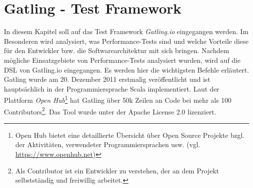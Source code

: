 \chapter{Gatling - Test Framework}

In diesem Kapitel soll auf das Test Framework \textit{Gatling.io} eingegangen werden. Im Besonderen wird analysiert, was Performance-Tests sind und welche Vorteile diese für den Entwickler bzw. die Softwarearchitektur mit sich bringen.
\newline
Nachdem mögliche Einsatzgebiete von Performance-Tests analysiert wurden, wird auf die \ac{DSL} von Gatling.io eingegangen. Es werden hier die wichtigsten Befehle erläutert.\\
Gatling wurde am 20. Dezember 2011 erstmalig veröffentlicht und ist hauptsächlich in der Programmiersprache Scala implementiert. Laut der Plattform \textit{Open Hub}\footnote{{}Open Hub bietet eine detaillierte Übersicht über Open Source Projekte bzgl. der Aktivitäten, verwendeter Programmiersprachen usw. (vgl. \url{https://www.openhub.net})} hat Gatling über 50k Zeilen an Code bei mehr als 100 Contributors\footnote{{} Als Contributor ist ein Entwickler zu verstehen, der an dem Projekt selbstständig und freiwillig arbeitet.}.\cite{Gatli41:online} Das Tool wurde unter der Apache License 2.0 lizenziert.

